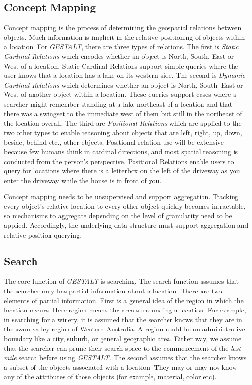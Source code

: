 \subsection{Concept Mapping}
Concept mapping is the process of determining the geospatial relations between objects. Much information is implicit in the relative positioning of objects within a location. For \textit{GESTALT}, there are three types of relations. 
The first is \textit{Static Cardinal Relations} which encodes whether an object is North, South, East or West of a location. Static Cardinal Relations support simple queries where the user knows that a location has a lake on its western side. 
The second is \textit{Dynamic Cardinal Relations} which determines whether an object is North, South, East or West of another object within a location. These queries support cases where a searcher might remember standing at a lake northeast of a location and that there was a swingset to the immediate west of them but still in the northeast of the location overall. 
The third are \textit{Positional Relations} which are applied to the two other types to enable reasoning about objects that are left, right, up, down, beside, behind etc., other objects. 
Positional relation use will be extensive because few humans think in cardinal directions, and most spatial reasoning is conducted from the person's perspective. 
Positional Relations enable users to query for locations where there is a letterbox on the left of the driveway as you enter the driveway while the house is in front of you. 

Concept mapping needs to be unsupervised and support aggregation. Tracking every object's relative location to every other object quickly becomes intractable, so mechanisms to aggregate depending on the level of granularity need to be applied. 
Accordingly, the underlying data structure must support aggregation and relative position querying. 

\subsection{Search}
The core function of \textit{GESTALT} is searching. The search function assumes that the searcher only has partial information about a location. 
There are two elements of partial information. First is a general idea of the region in which the location occurs. Here region means the area surrounding a location. 
For example, in searching for a winery, it is assumed that the searcher knows that they are in the swan valley region of Western Australia. A region could be an administrative boundary like a city, suburb, or general geographic area. 
Either way, we assume that the searcher can prune their search space to the commencement of the \textit{last-mile} search before using \textit{GESTALT}.
The second assumes that the searcher knows a subset of the objects associated with a location. They may or may not know any of the attributes of those objects (for example, material, color etc). 


